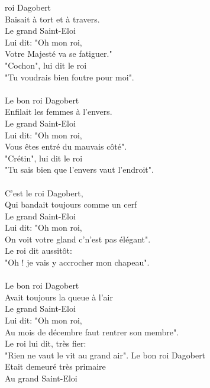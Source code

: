 
 roi Dagobert
\\Baisait à tort et à travers.
\\Le grand Saint-Eloi
\\Lui dit: "Oh mon roi,
\\Votre Majesté va se fatiguer."
\\"Cochon", lui dit le roi
\\"Tu voudrais bien foutre pour moi".
\\\\Le bon roi Dagobert
\\Enfilait les femmes à l'envers.
\\Le grand Saint-Eloi
\\Lui dit: "Oh mon roi,
\\Vous êtes entré du mauvais côté".
\\"Crétin", lui dit le roi
\\"Tu sais bien que l'envers vaut l'endroit".
\\\\C'est le roi Dagobert,
\\Qui bandait toujours comme un cerf
\\Le grand Saint-Eloi
\\Lui dit: "Oh mon roi,
\\On voit votre gland c'n'est pas élégant".
\\Le roi dit aussitôt:
\\"Oh ! je vais y accrocher mon chapeau".
\\\\Le bon roi Dagobert
\\Avait toujours la queue à l'air
\\Le grand Saint-Eloi
\\Lui dit: "Oh mon roi,
\\Au mois de décembre faut rentrer son membre".
\\Le roi lui dit, très fier:
\\"Rien ne vaut le vit au grand air".
\breakpage
Le bon roi Dagobert
\\Etait demeuré très primaire
\\Au grand Saint-Eloi
